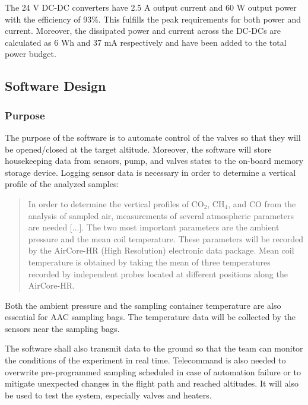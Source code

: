 \documentclass[a4paper,12pt,twoside]{article}
\begin{document}
The 24 V DC-DC converters have 2.5 A output current and 60 W output power with the efficiency of 93\%. This fulfills the peak requirements for both power and current. Moreover, the dissipated power and current across the DC-DCs are calculated as 6 Wh and 37 mA respectively and have been added to the total power budget. 



\raggedbottom

\pagebreak
\subsection{Software Design}
\subsubsection{Purpose}
The purpose of the software is to automate control of the valves so that they will be opened/closed at the target altitude. Moreover, the software will store housekeeping data from sensors, pump, and valves states to the on-board memory storage device. Logging sensor data is necessary in order to determine a vertical profile of the analyzed samples:

\begin{quote}
In order to determine the vertical profiles of CO$_2$, CH$_4$, and CO from the analysis of sampled air, measurements of several atmospheric parameters are needed [...]. The two most important parameters are the ambient pressure and the mean coil temperature. These parameters will be recorded by the AirCore-HR (High Resolution) electronic data package. Mean coil temperature is obtained by taking the mean of three temperatures recorded by independent probes located at different positions along the AirCore-HR.\cite{Membrive}
\end{quote}

Both the ambient pressure and the sampling container temperature are also essential for AAC sampling bags. The temperature data will be collected by the sensors near the sampling bags.

The software shall also transmit data to the ground so that the team can monitor the conditions of the experiment in real time. Telecommand is also needed to overwrite pre-programmed sampling scheduled in case of automation failure or to mitigate unexpected changes in the flight path and reached altitudes. It will also be used to test the system, especially valves and heaters.\par
\end{document}
